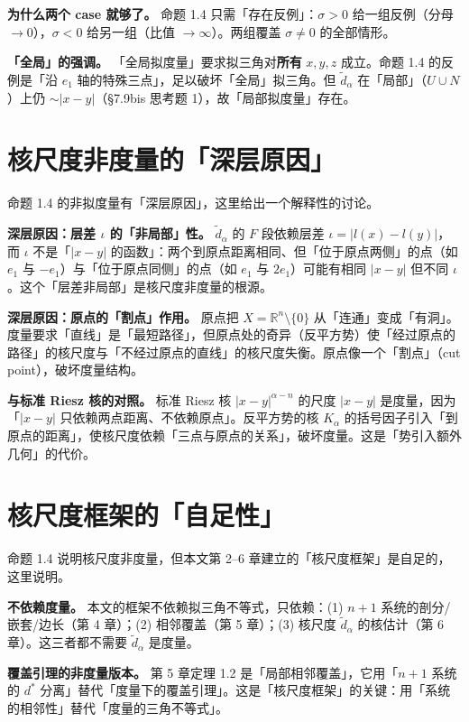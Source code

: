 \documentclass[a4paper,11pt,openany]{ctexbook}
\numberwithin{equation}{chapter}
\numberwithin{figure}{chapter}
\numberwithin{table}{chapter}
\begin{document}
\textbf{为什么两个 case 就够了。} 命题 1.4 只需「存在反例」：$\sigma>0$ 给一组反例（分母 $\to0$），$\sigma<0$ 给另一组（比值 $\to\infty$）。两组覆盖 $\sigma\neq0$ 的全部情形。

\textbf{「全局」的强调。} 「全局拟度量」要求拟三角对\textbf{所有} $x,y,z$ 成立。命题 1.4 的反例是「沿 $e_1$ 轴的特殊三点」，足以破坏「全局」拟三角。但 $\widetilde d_\alpha$ 在「局部」（$U\cup N$）上仍 $\sim|x-y|$（§7.9bis 思考题 1），故「局部拟度量」存在。

\section{核尺度非度量的「深层原因」}

命题 1.4 的非拟度量有「深层原因」，这里给出一个解释性的讨论。

\textbf{深层原因：层差 $\iota$ 的「非局部」性。} $\widetilde d_\alpha$ 的 $F$ 段依赖层差 $\iota=|l(x)-l(y)|$，而 $\iota$ 不是「$|x-y|$ 的函数」：两个到原点距离相同、但「位于原点两侧」的点（如 $e_1$ 与 $-e_1$）与「位于原点同侧」的点（如 $e_1$ 与 $2e_1$）可能有相同 $|x-y|$ 但不同 $\iota$。这个「层差非局部」是核尺度非度量的根源。

\textbf{深层原因：原点的「割点」作用。} 原点把 $X=\mathbb R^n\setminus\{0\}$ 从「连通」变成「有洞」。度量要求「直线」是「最短路径」，但原点处的奇异（反平方势）使「经过原点的路径」的核尺度与「不经过原点的直线」的核尺度失衡。原点像一个「割点」（cut point），破坏度量结构。

\textbf{与标准 Riesz 核的对照。} 标准 Riesz 核 $|x-y|^{\alpha-n}$ 的尺度 $|x-y|$ 是度量，因为「$|x-y|$ 只依赖两点距离、不依赖原点」。反平方势的核 $K_\alpha$ 的括号因子引入「到原点的距离」，使核尺度依赖「三点与原点的关系」，破坏度量。这是「势引入额外几何」的代价。

\section{核尺度框架的「自足性」}

命题 1.4 说明核尺度非度量，但本文第 2–6 章建立的「核尺度框架」是自足的，这里说明。

\textbf{不依赖度量。} 本文的框架不依赖拟三角不等式，只依赖：(1) $n+1$ 系统的剖分/嵌套/边长（第 4 章）；(2) 相邻覆盖（第 5 章）；(3) 核尺度 $\widetilde d_\alpha$ 的核估计（第 6 章）。这三者都不需要 $\widetilde d_\alpha$ 是度量。

\textbf{覆盖引理的非度量版本。} 第 5 章定理 1.2 是「局部相邻覆盖」，它用「$n+1$ 系统的 $d^*$ 分离」替代「度量下的覆盖引理」。这是「核尺度框架」的关键：用「系统的相邻性」替代「度量的三角不等式」。
\end{document}
